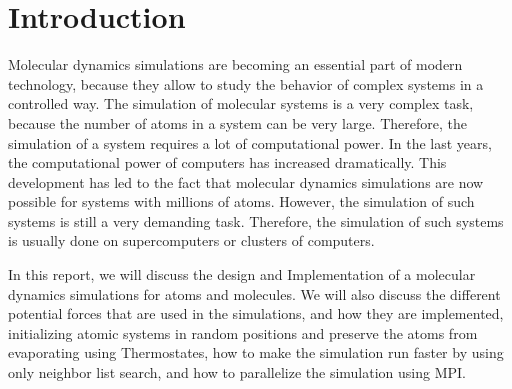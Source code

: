 \chapter{Introduction}\label{chap:introduction}

Molecular dynamics simulations are becoming an essential part of modern technology, because
they allow to study the behavior of complex systems in a controlled way. The simulation of
molecular systems is a very complex task, because the number of atoms in a system can be
very large. Therefore, the simulation of a system requires a lot of computational power. In
the last years, the computational power of computers has increased dramatically. This
development has led to the fact that molecular dynamics simulations are now possible for
systems with millions of atoms. However, the simulation of such systems is still a very
demanding task. Therefore, the simulation of such systems is usually done on supercomputers
or clusters of computers.  

In this report, we will discuss the design and Implementation of a molecular 
dynamics simulations for atoms and molecules. We will also discuss the different potential
forces that are used in the simulations, and how they are implemented, initializing atomic 
systems in random positions and preserve the atoms from evaporating using Thermostates, how
to make the simulation run faster by using only neighbor list search, and how to parallelize
the simulation using MPI.



